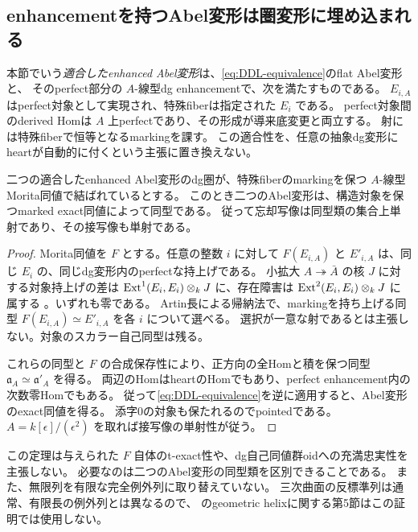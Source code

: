 \subsection{enhancementを持つAbel変形は圏変形に埋め込まれる}
\begin{definition}\label{def:compatible-abelian}
本節でいう\emph{適合したenhanced Abel変形}は、\eqref{eq:DDL-equivalence}のflat Abel変形と、
そのperfect部分の $A$-線型dg enhancementで、次を満たすものである。
$E_{i,A}$ はperfect対象として実現され、特殊fiberは指定された $E_i$ である。
perfect対象間のderived Homは $A$ 上perfectであり、その形成が導来底変更と両立する。
射には特殊fiberで恒等となるmarkingを課す。
この適合性を、任意の抽象dg変形にheartが自動的に付くという主張に置き換えない。
\end{definition}

\begin{theorem}[全Artin底での同型類の単射性]\label{thm:artin-injective}
二つの適合したenhanced Abel変形のdg圏が、特殊fiberのmarkingを保つ
$A$-線型Morita同値で結ばれているとする。
このとき二つのAbel変形は、構造対象を保つmarked exact同値によって同型である。
従って忘却写像は同型類の集合上単射であり、その接写像も単射である。
\end{theorem}
\begin{proof}
Morita同値を $F$ とする。任意の整数 $i$ に対して
$F(E_{i,A})$ と $E'_{i,A}$ は、同じ $E_i$ の、同じdg変形内のperfectな持上げである。
小拡大 $A\twoheadrightarrow\bar A$ の核 $J$ に対する対象持上げの差は
$\operatorname{Ext}^1(E_i,E_i)\otimes_kJ$ に、存在障害は $\operatorname{Ext}^2(E_i,E_i)\otimes_kJ$ に属する
\cite{LowenObject}。いずれも零である。
Artin長による帰納法で、markingを持ち上げる同型
$F(E_{i,A})\simeq E'_{i,A}$ を各 $i$ について選べる。
選択が一意な射であるとは主張しない。対象のスカラー自己同型は残る。

これらの同型と $F$ の合成保存性により、正方向の全Homと積を保つ同型
$\mathfrak a_A\simeq\mathfrak a'_A$ を得る。
両辺のHomはheartのHomでもあり、perfect enhancement内の次数零Homでもある。
従って\eqref{eq:DDL-equivalence}を逆に適用すると、Abel変形のexact同値を得る。
添字0の対象も保たれるのでpointedである。
$A=k[\epsilon]/(\epsilon^2)$ を取れば接写像の単射性が従う。
\end{proof}

\begin{remark}
この定理は与えられた $F$ 自体のt-exact性や、dg自己同値群oidへの充満忠実性を主張しない。
必要なのは二つのAbel変形の同型類を区別できることである。
また、無限列を有限な完全例外列に取り替えていない。
三次曲面の反標準列は通常、有限長の例外列とは異なるので、
\cite{DeDekenLowen}のgeometric helixに関する第5節はこの証明では使用しない。
\end{remark}

